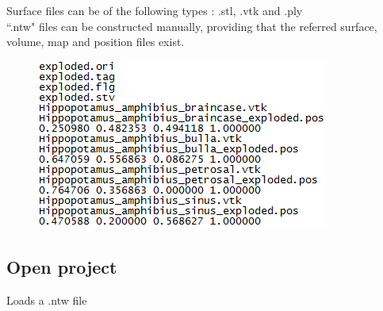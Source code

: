  
Surface files can be of the following types : .stl, .vtk and .ply\\
``.ntw" files can be constructed manually, providing that the referred surface, volume, map and position files exist.



\begin{figure}
  \centering  
 \includegraphics[scale=0.5]{images/07/project/ntw.png}
\label{project_file}
\end{figure}

\subsection{Open project}
Loads a .ntw file

